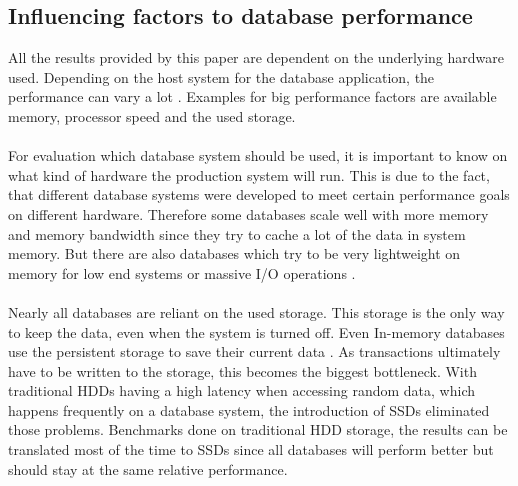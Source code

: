 \subsection{Influencing factors to database performance}
All the results provided by this paper are dependent on the underlying hardware used. Depending on the host system for the database application, the performance can vary a lot \cite{Lee_W._2009}. Examples for big performance factors are available memory, processor speed and the used storage.
\\\\
For evaluation which database system should be used, it is important to know on what kind of hardware the production system will run. This is due to the fact, that different database systems were developed to meet certain performance goals on different hardware. Therefore some databases scale well with more memory and memory bandwidth since they try to cache a lot of the data in system memory. But there are also databases which try to be very lightweight on memory for low end systems or massive I/O  operations \cite{Boncz_Database_1999}.
\\\\
Nearly all databases are reliant on the used storage. This storage is the only way to keep the data, even when the system is turned off. Even In-memory databases use the persistent storage to save their current data \cite{Wang_Main_2001}. As transactions ultimately have to be written to the storage, this becomes the biggest bottleneck. With traditional HDDs having a high latency when accessing random data, which happens frequently on a database system, the introduction of SSDs  eliminated those problems. Benchmarks done on traditional HDD storage, the results can be translated most of the time to SSDs since all databases will perform better but should stay at the same relative performance.
